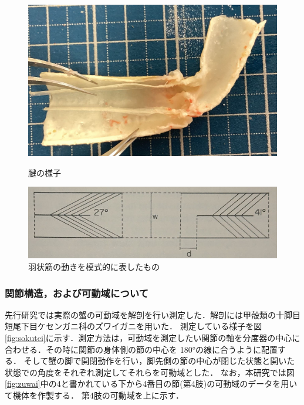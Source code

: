 \begin{figure}[t]
  \begin{minipage}[b]{0.39\hsize}
    \centering
    \includegraphics[scale=0.1]{image/setukanmaku.jpg}
    \caption{腱の様子\cite{hasegawa}}
    \label{fig:ken}
  \end{minipage}
  \begin{minipage}[b]{0.6\hsize}
    \centering
    \includegraphics[scale=0.18]{image/ujo.JPG}
    \caption{羽状筋の動きを模式的に表したもの\cite{warner1977biology}}
    \label{fig:ujo}
  \end{minipage}
\end{figure}
\subsubsection{関節構造，および可動域について}
先行研究\cite{hasegawa}では実際の蟹の可動域を解剖を行い測定した．解剖には甲殻類の十脚目短尾下目ケセンガニ科のズワイガニを用いた．
測定している様子を図\ref{fig:sokutei}に示す．測定方法は，可動域を測定したい関節の軸を分度器の中心に合わせる．その時に関節の身体側の節の中心を 180°の線に合うように配置する．
そして蟹の脚で開閉動作を行い，脚先側の節の中心が閉じた状態と開いた状態での角度をそれぞれ測定してそれらを可動域とした．
なお，本研究では図\ref{fig:zuwai}中の4と書かれている下から4番目の節(第4肢)の可動域のデータを用いて機体を作製する．
第4肢の可動域を上に示す．
